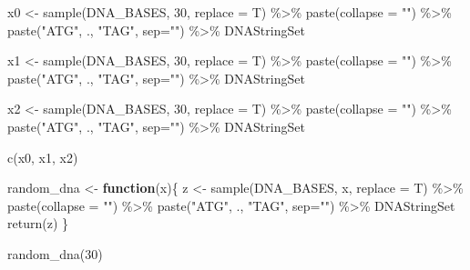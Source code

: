 \documentclass[
]{book}
\newenvironment{Shaded}{\begin{snugshade}}{\end{snugshade}}
\newcommand{\AttributeTok}[1]{\textcolor[rgb]{0.77,0.63,0.00}{#1}}
\newcommand{\ControlFlowTok}[1]{\textcolor[rgb]{0.13,0.29,0.53}{\textbf{#1}}}
\newcommand{\DecValTok}[1]{\textcolor[rgb]{0.00,0.00,0.81}{#1}}
\newcommand{\FunctionTok}[1]{\textcolor[rgb]{0.00,0.00,0.00}{#1}}
\newcommand{\NormalTok}[1]{#1}
\newcommand{\OtherTok}[1]{\textcolor[rgb]{0.56,0.35,0.01}{#1}}
\newcommand{\SpecialCharTok}[1]{\textcolor[rgb]{0.00,0.00,0.00}{#1}}
\newcommand{\StringTok}[1]{\textcolor[rgb]{0.31,0.60,0.02}{#1}}
\begin{document}
\begin{Shaded}
\begin{Highlighting}[]

\NormalTok{x0 }\OtherTok{\textless{}{-}} \FunctionTok{sample}\NormalTok{(DNA\_BASES, }\DecValTok{30}\NormalTok{, }\AttributeTok{replace =}\NormalTok{ T) }\SpecialCharTok{\%\textgreater{}\%}
        \FunctionTok{paste}\NormalTok{(}\AttributeTok{collapse =} \StringTok{""}\NormalTok{) }\SpecialCharTok{\%\textgreater{}\%} 
        \FunctionTok{paste}\NormalTok{(}\StringTok{"ATG"}\NormalTok{, ., }\StringTok{"TAG"}\NormalTok{, }\AttributeTok{sep=}\StringTok{""}\NormalTok{) }\SpecialCharTok{\%\textgreater{}\%} 
\NormalTok{        DNAStringSet}

\NormalTok{x1 }\OtherTok{\textless{}{-}} \FunctionTok{sample}\NormalTok{(DNA\_BASES, }\DecValTok{30}\NormalTok{, }\AttributeTok{replace =}\NormalTok{ T) }\SpecialCharTok{\%\textgreater{}\%}
        \FunctionTok{paste}\NormalTok{(}\AttributeTok{collapse =} \StringTok{""}\NormalTok{) }\SpecialCharTok{\%\textgreater{}\%} 
        \FunctionTok{paste}\NormalTok{(}\StringTok{"ATG"}\NormalTok{, ., }\StringTok{"TAG"}\NormalTok{, }\AttributeTok{sep=}\StringTok{""}\NormalTok{) }\SpecialCharTok{\%\textgreater{}\%} 
\NormalTok{        DNAStringSet}

\NormalTok{x2 }\OtherTok{\textless{}{-}} \FunctionTok{sample}\NormalTok{(DNA\_BASES, }\DecValTok{30}\NormalTok{, }\AttributeTok{replace =}\NormalTok{ T) }\SpecialCharTok{\%\textgreater{}\%}
        \FunctionTok{paste}\NormalTok{(}\AttributeTok{collapse =} \StringTok{""}\NormalTok{) }\SpecialCharTok{\%\textgreater{}\%} 
        \FunctionTok{paste}\NormalTok{(}\StringTok{"ATG"}\NormalTok{, ., }\StringTok{"TAG"}\NormalTok{, }\AttributeTok{sep=}\StringTok{""}\NormalTok{) }\SpecialCharTok{\%\textgreater{}\%} 
\NormalTok{        DNAStringSet}

\FunctionTok{c}\NormalTok{(x0, x1, x2)}


\NormalTok{random\_dna }\OtherTok{\textless{}{-}} \ControlFlowTok{function}\NormalTok{(x)\{}
\NormalTok{  z }\OtherTok{\textless{}{-}} \FunctionTok{sample}\NormalTok{(DNA\_BASES, x, }\AttributeTok{replace =}\NormalTok{ T) }\SpecialCharTok{\%\textgreater{}\%}
        \FunctionTok{paste}\NormalTok{(}\AttributeTok{collapse =} \StringTok{""}\NormalTok{) }\SpecialCharTok{\%\textgreater{}\%} 
        \FunctionTok{paste}\NormalTok{(}\StringTok{"ATG"}\NormalTok{, ., }\StringTok{"TAG"}\NormalTok{, }\AttributeTok{sep=}\StringTok{""}\NormalTok{) }\SpecialCharTok{\%\textgreater{}\%} 
\NormalTok{        DNAStringSet}
  \FunctionTok{return}\NormalTok{(z)}
\NormalTok{\}}

\FunctionTok{random\_dna}\NormalTok{(}\DecValTok{30}\NormalTok{)}
\end{Highlighting}
\end{Shaded}
\end{document}
